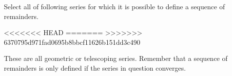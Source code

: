 \documentclass{ximera}
\author{Jim Talamo}
\begin{document}
\begin{exercise}

Select all of following series for which it is possible to define a sequence of remainders.

\begin{selectAll}
<<<<<<< HEAD
=======
>>>>>>> 6370795d971fad0695b8bbcf11626b151dd3c490
\end{selectAll}

\begin{hint}
These are all geometric or telescoping series.  Remember that a sequence of remainders is only defined if the series in question converges.
\end{hint}
\end{exercise}
\end{document}
